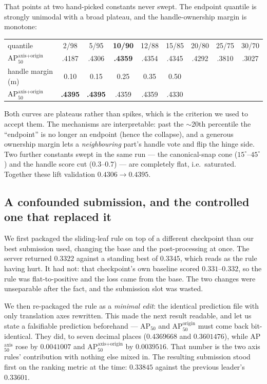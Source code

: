 \documentclass[11pt]{article}
\newcommand{\metric}{AP$_{50}^{\text{axis+origin}}$}
\newcommand{\apfifty}{AP$_{50}$}
\begin{document}
That points at two hand-picked constants never swept. The endpoint quantile
is strongly unimodal with a broad plateau, and the handle-ownership margin
is monotone:

\begin{center}
\small
\begin{tabular}{lcccccccc}
\toprule
quantile & 2/98 & 5/95 & \textbf{10/90} & 12/88 & 15/85 & 20/80 & 25/75 & 30/70 \\
\metric{} & .4187 & .4306 & \textbf{.4359} & .4354 & .4345 & .4292 & .3810 & .3027 \\
\midrule
handle margin (m) & 0.10 & 0.15 & 0.25 & 0.35 & 0.50 & & & \\
\metric{} & \textbf{.4395} & \textbf{.4395} & .4359 & .4359 & .4330 & & & \\
\bottomrule
\end{tabular}
\end{center}

Both curves are plateaus rather than spikes, which is the criterion we used
to accept them. The mechanisms are interpretable: past the $\sim$20th
percentile the ``endpoint'' is no longer an endpoint (hence the collapse),
and a generous ownership margin lets a \emph{neighbouring} part's handle
vote and flip the hinge side. Two further constants swept in the same run
--- the canonical-snap cone ($15^\circ$--$45^\circ$) and the handle score cut
($0.3$--$0.7$) --- are completely flat, i.e.\ saturated. Together these lift
validation $0.4306 \rightarrow 0.4395$.

\subsection{A confounded submission, and the controlled one that replaced it}
\label{sec:confound}

We first packaged the sliding-leaf rule on top of a different checkpoint
than our best submission used, changing the base and the post-processing at
once. The server returned $0.3322$ against a standing best of $0.3345$,
which reads as the rule having hurt. It had not: that checkpoint's own
baseline scored $0.331$--$0.332$, so the rule was flat-to-positive and the
loss came from the base. The two changes were unseparable after the fact,
and the submission slot was wasted.

We then re-packaged the rule as a \emph{minimal edit}: the identical
prediction file with only translation axes rewritten. This made the next
result readable, and let us state a falsifiable prediction beforehand ---
\apfifty{} and AP$_{50}^{\text{origin}}$ must come back bit-identical. They
did, to seven decimal places ($0.4369668$ and $0.3601476$), while
AP$_{50}^{\text{axis}}$ rose by $0.0041007$ and \metric{} by $0.0039516$.
That number is the two axis rules' contribution with nothing else mixed in.
The resulting submission stood first on the ranking metric at the time:
$0.33845$ against the previous leader's $0.33601$.
\end{document}
